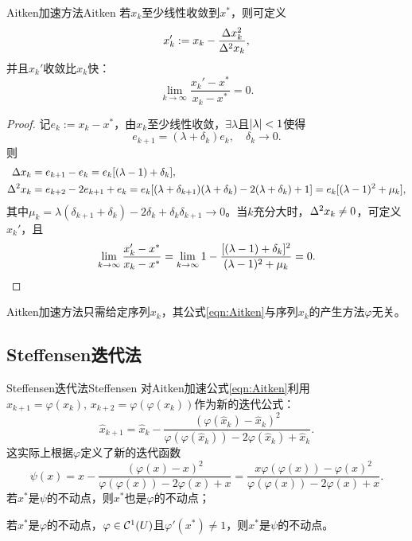 \begin{theorem}
    {Aitken加速方法}{Aitken}
    若$x_k$至少线性收敛到$x^*$，则可定义
    \begin{equation}
        \label{eqn:Aitken}
        x_k':=x_k-\frac{\Delta x_k^2}{\Delta^2x_k},
    \end{equation}
    并且$x_k'$收敛比$x_k$快：
    \[
        \lim_{k\to\infty}\frac{x_k'-x^*}{x_k-x^*}=0.
    \]
\end{theorem}

\begin{proof}
    记$e_k:=x_k-x^*$，由$x_k$至少线性收敛，$\exists\lambda$且$\left\lvert\lambda\right\rvert<1$使得 
    \[
        e_{k+1}=(\lambda+\delta_k)e_k,\quad\delta_k\to 0.
    \]
    则
    \begin{align*}
        \Delta x_k&=e_{k+1}-e_k=e_k[(\lambda-1)+\delta_k],\\
        \Delta^2x_k&=e_{k+2}-2e_{k+1}+e_k=e_k[(\lambda+\delta_{k+1})(\lambda+\delta_k)-2(\lambda+\delta_k)+1]=e_k[(\lambda-1)^2+\mu_k],
    \end{align*}
    其中$\mu_k=\lambda(\delta_{k+1}+\delta_k)-2\delta_k+\delta_k\delta_{k+1}\to 0$。当$k$充分大时，$\Delta^2x_k\neq 0$，可定义$x_k'$，且
    \[
        \lim_{k\to\infty}\frac{x_k'-x^*}{x_k-x^*}=\lim_{k\to\infty}1-\frac{[(\lambda-1)+\delta_k]^2}{(\lambda-1)^2+\mu_k}=0.
        \qedhere
    \]
\end{proof}

\begin{remark}
    Aitken加速方法只需给定序列$x_k$，其公式\eqref{eqn:Aitken}与序列$x_k$的产生方法$\varphi$无关。
\end{remark}

\subsection{Steffensen迭代法}

\begin{theorem}
    {Steffensen迭代法}{Steffensen}
    对Aitken加速公式\eqref{eqn:Aitken}利用$x_{k+1}=\varphi(x_k),\,x_{k+2}=\varphi(\varphi(x_k))$作为新的迭代公式：
    \[
        \hat x_{k+1}=\hat x_k-\frac{(\varphi(\hat x_k)-\hat x_k)^2}{\varphi(\varphi(\hat x_k))-2\varphi(\hat x_k)+\hat x_k}.
    \]
    这实际上根据$\varphi$定义了新的迭代函数
    \begin{equation}
        \psi(x)=x-\frac{(\varphi(x)-x)^2}{\varphi(\varphi(x))-2\varphi(x)+x}=\frac{x\varphi(\varphi(x))-\varphi(x)^2}{\varphi(\varphi(x))-2\varphi(x)+x}.
    \end{equation}
    若$x^*$是$\psi$的不动点，则$x^*$也是$\varphi$的不动点；

    若$x^*$是$\varphi$的不动点，$\varphi\in\mathcal C^1(U)$且$\varphi'(x^*)\neq 1$，则$x^*$是$\psi$的不动点。
\end{theorem}

